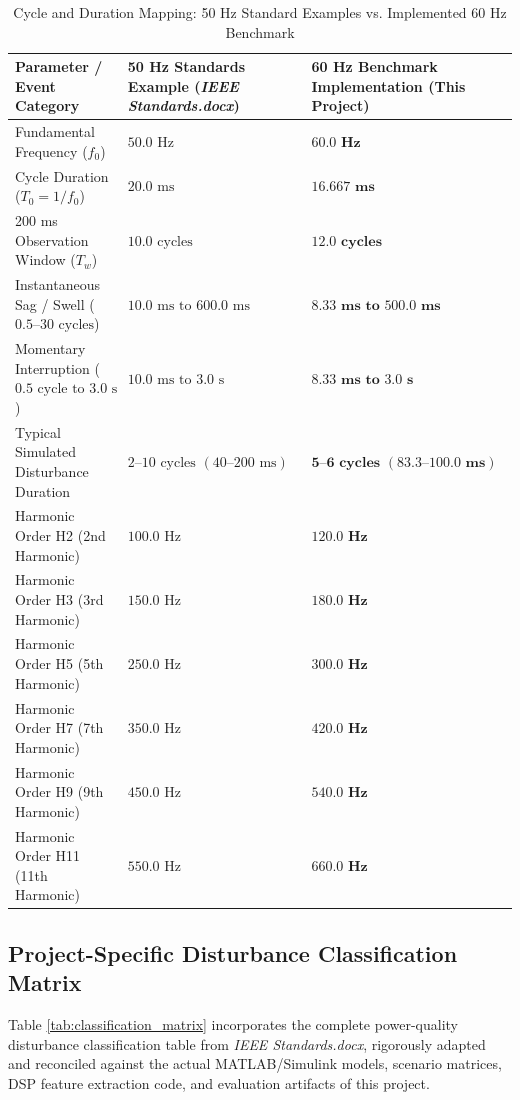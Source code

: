 \documentclass[12pt,a4paper]{report}
\begin{document}
\begin{table}[H]
\centering
\caption{Cycle and Duration Mapping: 50 Hz Standard Examples vs. Implemented 60 Hz Benchmark}
\label{tab:freq_mapping}
\small
\begin{tabularx}{\textwidth}{lXX}
\toprule
\textbf{Parameter / Event Category} & \textbf{50 Hz Standards Example (\textit{IEEE Standards.docx})} & \textbf{60 Hz Benchmark Implementation (This Project)} \\
\midrule
Fundamental Frequency ($f_0$) & $50.0\text{ Hz}$ & $\mathbf{60.0\text{ Hz}}$ \\
Cycle Duration ($T_0 = 1/f_0$) & $20.0\text{ ms}$ & $\mathbf{16.667\text{ ms}}$ \\
200 ms Observation Window ($T_w$) & $10.0\text{ cycles}$ & $\mathbf{12.0\text{ cycles}}$ \\
Instantaneous Sag / Swell ($0.5\text{--}30\text{ cycles}$) & $10.0\text{ ms to }600.0\text{ ms}$ & $\mathbf{8.33\text{ ms to }500.0\text{ ms}}$ \\
Momentary Interruption ($0.5\text{ cycle to }3.0\text{ s}$) & $10.0\text{ ms to }3.0\text{ s}$ & $\mathbf{8.33\text{ ms to }3.0\text{ s}}$ \\
Typical Simulated Disturbance Duration & $2\text{--}10\text{ cycles } (40\text{--}200\text{ ms})$ & $\mathbf{5\text{--}6\text{ cycles } (83.3\text{--}100.0\text{ ms})}$ \\
Harmonic Order H2 (2nd Harmonic) & $100.0\text{ Hz}$ & $\mathbf{120.0\text{ Hz}}$ \\
Harmonic Order H3 (3rd Harmonic) & $150.0\text{ Hz}$ & $\mathbf{180.0\text{ Hz}}$ \\
Harmonic Order H5 (5th Harmonic) & $250.0\text{ Hz}$ & $\mathbf{300.0\text{ Hz}}$ \\
Harmonic Order H7 (7th Harmonic) & $350.0\text{ Hz}$ & $\mathbf{420.0\text{ Hz}}$ \\
Harmonic Order H9 (9th Harmonic) & $450.0\text{ Hz}$ & $\mathbf{540.0\text{ Hz}}$ \\
Harmonic Order H11 (11th Harmonic) & $550.0\text{ Hz}$ & $\mathbf{660.0\text{ Hz}}$ \\
\bottomrule
\end{tabularx}
\end{table}

\subsection{Project-Specific Disturbance Classification Matrix}
Table \ref{tab:classification_matrix} incorporates the complete power-quality disturbance classification table from \textit{IEEE Standards.docx}, rigorously adapted and reconciled against the actual MATLAB/Simulink models, scenario matrices, DSP feature extraction code, and evaluation artifacts of this project.
\end{document}
